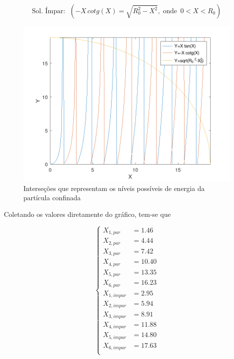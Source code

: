 \begin{equation}
	\mbox{Sol. Ímpar: }\;\left( -X\,cotg(X)=\sqrt{R_0^2-X^2},\;\mbox{onde
	}\,0<X<R_0 \right)
\end{equation}

\begin{figure}[H] \centering
	\includegraphics[width=1\textwidth]{../images/q3a.png}
	\caption{ Interseções que representam os níveis possíveis de energia da
		partícula confinada }
	\label{fig:q3a}
\end{figure}

Coletando os valores diretamente do gráfico, tem-se que

\begin{equation}
	\begin{cases}
		X_{1,par}   & = 1.46  \\
		X_{2,par}   & = 4.44  \\
		X_{3,par}   & = 7.42  \\
		X_{4,par}   & = 10.40 \\
		X_{5,par}   & = 13.35 \\
		X_{6,par}   & = 16.23 \\
		X_{1,impar} & = 2.95  \\
		X_{2,impar} & = 5.94  \\
		X_{3,impar} & = 8.91  \\
		X_{4,impar} & = 11.88 \\
		X_{5,impar} & = 14.80 \\
		X_{6,impar} & = 17.63 \\
	\end{cases}
\end{equation}

